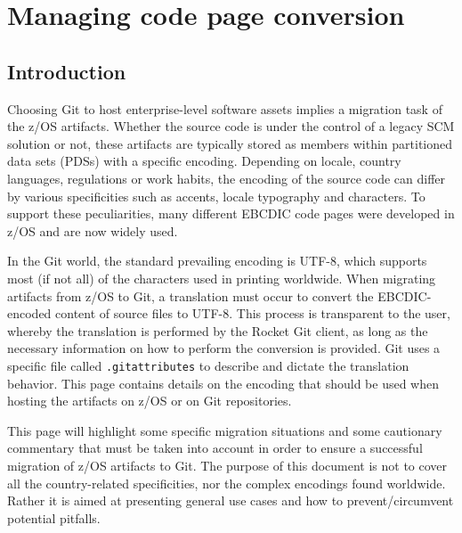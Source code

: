 \documentclass[
  letterpaper,
  DIV=11,
  numbers=noendperiod]{scrartcl}
\author{}
\date{}
\renewcommand*\contentsname{Table of contents}
\newcommand\contentsname{Table of contents}
\begin{document}
\ifdefined\Shaded\renewenvironment{Shaded}{\begin{tcolorbox}[frame hidden, boxrule=0pt, interior hidden, borderline west={3pt}{0pt}{shadecolor}, sharp corners, enhanced, breakable]}{\end{tcolorbox}}\fi

\renewcommand*\contentsname{Table of contents}
{
\hypersetup{linkcolor=}
\setcounter{tocdepth}{3}
\tableofcontents
}
\hypertarget{managing-code-page-conversion}{%
\section{Managing code page
conversion}\label{managing-code-page-conversion}}

\hypertarget{introduction}{%
\subsection{Introduction}\label{introduction}}

Choosing Git to host enterprise-level software assets implies a
migration task of the z/OS artifacts. Whether the source code is under
the control of a legacy SCM solution or not, these artifacts are
typically stored as members within partitioned data sets (PDSs) with a
specific encoding. Depending on locale, country languages, regulations
or work habits, the encoding of the source code can differ by various
specificities such as accents, locale typography and characters. To
support these peculiarities, many different EBCDIC code pages were
developed in z/OS and are now widely used.

In the Git world, the standard prevailing encoding is UTF-8, which
supports most (if not all) of the characters used in printing worldwide.
When migrating artifacts from z/OS to Git, a translation must occur to
convert the EBCDIC-encoded content of source files to UTF-8. This
process is transparent to the user, whereby the translation is performed
by the Rocket Git client, as long as the necessary information on how to
perform the conversion is provided. Git uses a specific file called
\texttt{.gitattributes} to describe and dictate the translation
behavior. This page contains details on the encoding that should be used
when hosting the artifacts on z/OS or on Git repositories.

This page will highlight some specific migration situations and some
cautionary commentary that must be taken into account in order to ensure
a successful migration of z/OS artifacts to Git. The purpose of this
document is not to cover all the country-related specificities, nor the
complex encodings found worldwide. Rather it is aimed at presenting
general use cases and how to prevent/circumvent potential pitfalls.
\end{document}
